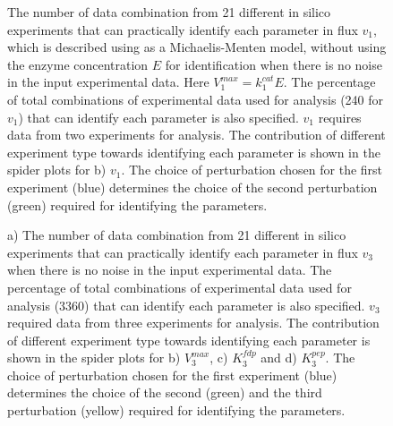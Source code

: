 \documentclass[10pt]{article}
\begin{document}
\begin{figure}[!tbhp]
	\caption{The number of data combination from 21 different in silico experiments that can practically identify each parameter in flux $v_1$, which is described using as a Michaelis-Menten model, without using the enzyme concentration $E$ for identification when there is no noise in the input experimental data. Here $V_1^{max} = k_1^{cat}E$. The percentage of total combinations of experimental data used for analysis (240 for $v_1$) that can identify each parameter is also specified. $v_1$ requires data from two experiments for analysis. The contribution of different experiment type towards identifying each parameter is shown in the spider plots for b) $v_1$. The choice of perturbation chosen for the first experiment (blue) determines the choice of the second perturbation (green) required for identifying the parameters.}\label{fig:v1_v1max_ck_ident}
\end{figure}	

\begin{figure}[!tbhp]
	\caption{a) The number of data combination from 21 different in silico experiments that can practically identify each parameter in flux $v_3$ when there is no noise in the input experimental data. The percentage of total combinations of experimental data used for analysis (3360) that can identify each parameter is also specified. $v_3$ required data from three experiments for analysis. The contribution of different experiment type towards identifying each parameter is shown in the spider plots for b) $V_3^{max}$, c) $K_3^{fdp}$ and d) $K_3^{pep}$. The choice of perturbation chosen for the first experiment (blue) determines the choice of the second (green) and the third perturbation (yellow) required for identifying the parameters.}\label{fig:v3_1_ck_ident}
\end{figure}	
\end{document}
